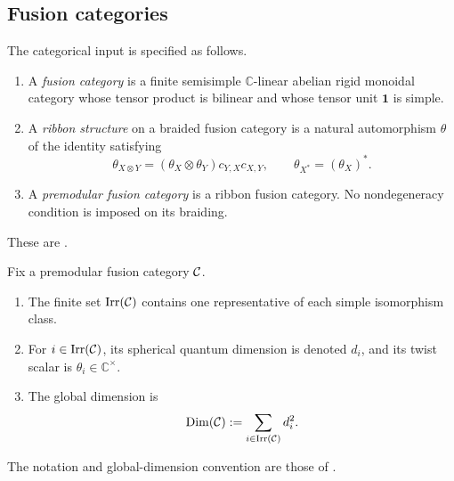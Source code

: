 \subsection{Fusion categories}
\label{subsec:fusion-categories}

\begin{definition}
\label{def:premodular-category}
The categorical input is specified as follows.
\begin{enumerate}[label=(\roman*),ref=\roman*]
  \item\label{item:fusion-category}
  A \emph{fusion category} is a finite semisimple $\mathbb C$-linear abelian
  rigid monoidal category whose tensor product is bilinear and whose tensor
  unit $\mathbf 1$ is simple.

  \item\label{item:ribbon-structure}
  A \emph{ribbon structure} on a braided fusion category is a natural
  automorphism $\theta$ of the identity satisfying
  \[
    \theta_{X\otimes Y}
    =(\theta_X\otimes\theta_Y)c_{Y,X}c_{X,Y},
    \qquad
    \theta_{X^*}=(\theta_X)^*.
  \]

  \item\label{item:premodular-category}
  A \emph{premodular fusion category} is a ribbon fusion category.  No
  nondegeneracy condition is imposed on its braiding.
\end{enumerate}
These are \cite[Definitions~4.1.1, 8.10.1, and 8.13.1]{EGNO2015}.
\end{definition}

\begin{convention}
\label{conv:simple-object-data}
Fix a premodular fusion category $\mathcal{C}$.
\begin{enumerate}[label=(\roman*),ref=\roman*]
  \item\label{item:simple-skeleton}
  The finite set $\operatorname{Irr}(\mathcal{C})$ contains one representative of
  each simple isomorphism class.

  \item\label{item:quantum-dimension}
  For $i\in\operatorname{Irr}(\mathcal{C})$, its spherical quantum dimension is
  denoted $d_i$, and its twist scalar is
  $\theta_i\in\mathbb C^\times$.

  \item\label{item:global-dimension}
  The global dimension is
  \[
    \operatorname{Dim}(\mathcal{C})
    :=\sum_{i\in\operatorname{Irr}(\mathcal{C})}d_i^2.
  \]
\end{enumerate}
The notation and global-dimension convention are those of
\cite[Sections~4.1 and~8.13, especially Equation~(8.53)]{EGNO2015}.
\end{convention}


